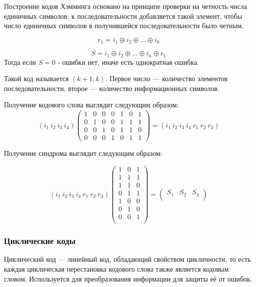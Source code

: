 Построение кодов Хэмминга основано на принципе проверки на четность числа единичных символов: к последовательности добавляется такой элемент, чтобы число единичных символов в получившейся последовательности было четным.

\begin{equation}
	r_1 = i_1 \oplus i_2 \oplus ... \oplus i_k
\end{equation}

\begin{equation}
	S = i_1 \oplus i_2 \oplus ... \oplus i_n \oplus r_1
\end{equation}
Тогда если $S = 0$ - ошибки нет, иначе есть однократная ошибка.

Такой код называется $(k+1,k)$. Первое число — количество элементов последовательности, второе — количество информационных символов.

Получение кодового слова выглядит следующим образом:
\begin{equation}
( i_1 \> i_2 \> i_3 \> i_4 )  \begin{pmatrix}
1 & 0 & 0 & 0 & 1 & 0 & 1 \\
0 & 1 & 0 & 0 & 1 & 1 & 1 \\         
0 & 0 & 1 & 0 & 1 & 1 & 0 \\
0 & 0 & 0 & 1 & 0 & 1 & 1
\end{pmatrix} = ( i_1 \> i_2 \> i_3 \> i_4  \> r_1  \> r_2  \> r_3)
\end{equation}

Получение синдрома выглядит следующим образом:

\begin{equation}
(i_{1} \> i_{2} \> i_{3} \> i_{4} \> r_{1} \> r_{2} \> r_{3} )  \begin{pmatrix}
1 & 0 & 1 \\
1 & 1 & 1 \\
1 & 1 & 0 \\
0 & 1 & 1 \\
1 & 0 & 0 \\
0 & 1 & 0 \\
0 & 0 & 1 \\ 
\end{pmatrix} = \begin{pmatrix}S_{1}&S_{2}&S_{3}\\\end{pmatrix}
\end{equation}

\subsubsection{Циклические коды}
Циклический код — линейный код, обладающий свойством цикличности, то есть каждая циклическая перестановка кодового слова также является кодовым словом. Используется для преобразования информации для защиты её от ошибок.

